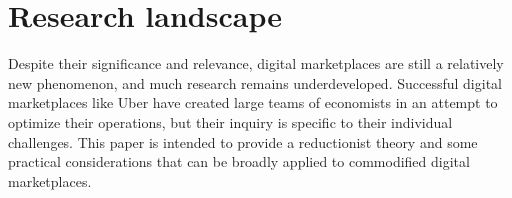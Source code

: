 \section{Research landscape}
Despite their significance and relevance, digital marketplaces are still a relatively new phenomenon, and much research remains underdeveloped. Successful digital marketplaces like Uber have created large teams of economists in an attempt to optimize their operations, but their inquiry is specific to their individual challenges. This paper is intended to provide a reductionist theory and some practical considerations that can be broadly applied to commodified digital marketplaces.
